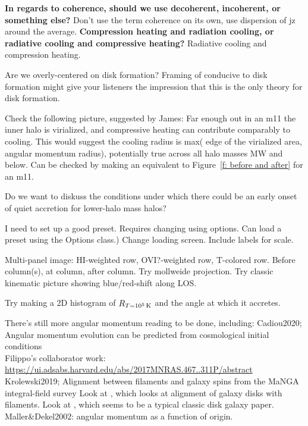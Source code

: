 \documentclass[fleqn,usenatbib]{mnras}
\newcommand{\Rcon}{R_{T=10^5\,{\rm K}}}
\begin{document}
\textbf{In regards to coherence, should we use decoherent, incoherent, or something else?}
Don't use the term coherence on its own, use dispersion of jz around the average.
\textbf{Compression heating and radiation cooling, or radiative cooling and compressive heating?}
Radiative cooling and compression heating.

Are we overly-centered on disk formation?
Framing of conducive to disk formation might give your listeners the impression that this is the only theory for disk formation.

Check the following picture, suggested by James:
Far enough out in an m11 the inner halo is virialized, and compressive heating can contribute comparably to cooling.
This would suggest the cooling radius is max( edge of the virialized area, angular momentum radius), potentially true across all halo masses MW and below.
Can be checked by making an equivalent to Figure~\ref{f: before and after} for an m11.

Do we want to diskuss the conditions under which there could be an early onset of quiet accretion for lower-halo mass halos?

I need to set up a good preset. Requires changing using options. Can load a preset using the Options class.)
Change loading screen.
Include labels for scale.

Multi-panel image:
HI-weighted row,
OVI?-weighted row,
T-colored row.
Before column(s), at column, after column.
Try mollweide projection.
Try classic kinematic picture showing blue/red-shift along LOS.

Try making a 2D histogram of $\Rcon$ and the angle at which it accretes.

There's still more angular momentum reading to be done, including:
Cadiou2020; Angular momentum evolution can be predicted from cosmological initial conditions\\
Filippo's collaborator work: \url{https://ui.adsabs.harvard.edu/abs/2017MNRAS.467..311P/abstract}\\
Krolewski2019; Alignment between filaments and galaxy spins from the {MaNGA} integral-field survey
Look at \cite{Bird2019}, which looks at alignment of galaxy disks with filaments.
Look at \cite{Bird2020}, which seems to be a typical classic disk galaxy paper.
Maller\&Dekel2002: angular momentum as a function of origin.
\end{document}
